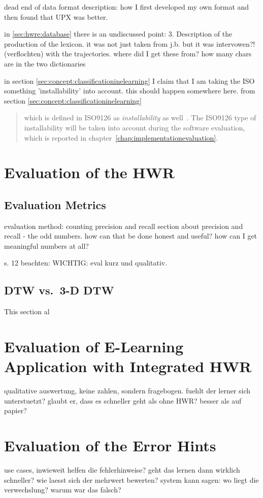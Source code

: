 dead end of data format description:
how I first developed my own format and then found that
UPX was better.


in \ref{sec:hwre:database} there is an undiscussed point:
   3. Description of the production of the lexicon.
      it was not just taken from j.b. but it was intervowen?! (verflochten) 
      with the trajectories. where did I get these from? 
      how many chars are in the two dictionaries

in section \ref{sec:concept:classificationinelearning} I claim that I am taking the ISO something 'installability' into account.
this should happen somewhere here.
from section \ref{sec:concept:classificationinelearning}
\begin{quote}
which is defined in ISO9126 as \emph{installability} as 
well~. 
The ISO9126 type of installability will be taken into account during the software
evaluation, which is reported in chapter~\ref{chap:implementationevaluation}.
  
\end{quote}



\section{Evaluation of the HWR}
\subsection{ Evaluation Metrics }
evaluation method: counting precision and recall
section about precision and recall - the odd numbers.
how can that be done honest and useful?
how can I get meaningful numbers at all?

s. 12 beachten: WICHTIG: eval kurz und qualitativ.

\subsection{DTW vs.~3-D DTW}
\label{sec:impl:dtwvs3ddtw} %
This section al

\section{Evaluation of E-Learning Application with Integrated HWR}
qualitative auswertung, keine zahlen, sondern fragebogen.
fuehlt der lerner sich unterstuetzt? glaubt er, dass es schneller geht als ohne 
HWR? 
besser als auf papier?

\section{Evaluation of the Error Hints}
use cases, inwieweit helfen die fehlerhinweise?
geht das lernen dann wirklich schneller?
wie laesst sich der mehrwert bewerten?
system kann sagen: wo liegt die verwechslung? warum war das falsch?


